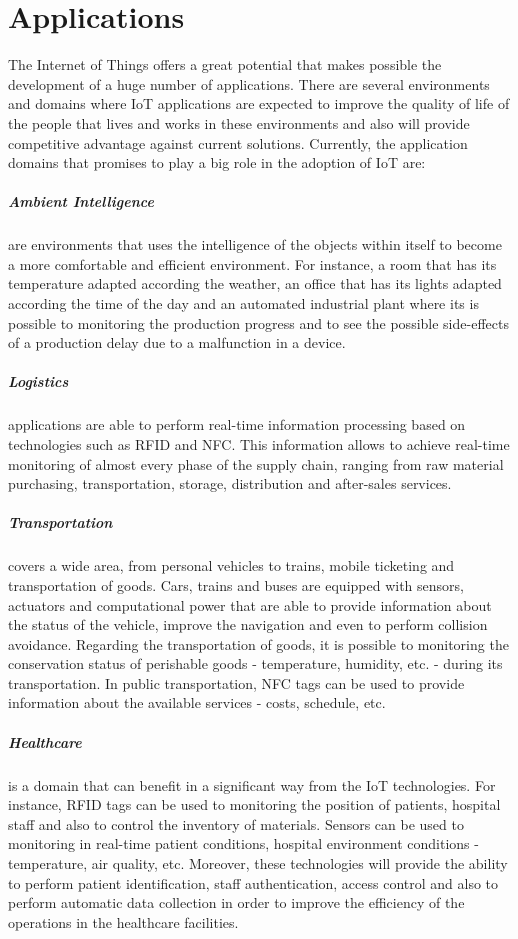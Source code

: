 \section{Applications}
\label{sec:applications}
The Internet of Things offers a great potential that makes possible the development of a huge number
of applications. There are several environments and domains where \gls{IoT} applications are expected
to improve the quality of life of the people that lives and works in these environments and also
will provide competitive advantage against current solutions. Currently, the application domains that
promises to play a big role in the adoption of \gls{IoT} are:

\subparagraph{Ambient Intelligence} are environments that uses the intelligence of the objects within
itself to become a more comfortable and efficient environment. For instance, a room that has its
temperature adapted according the weather, an office that has its lights adapted according the time
of the day and an automated industrial plant where its is possible to monitoring the production
progress and to see the  possible side-effects of a production delay due to a malfunction in a device.
\subparagraph{Logistics} applications are able to perform real-time information processing based
on technologies such as \gls{RFID} and \gls{NFC}. This information allows to achieve real-time monitoring
of almost every phase of the supply chain, ranging from raw material purchasing, transportation,
storage, distribution and after-sales services.
\subparagraph{Transportation} covers a wide area, from personal vehicles to trains, mobile ticketing
and transportation of goods. Cars, trains and buses are equipped with sensors, actuators and computational
power that are able to provide information about the status of the vehicle, improve the navigation and
even to perform collision avoidance. Regarding the transportation of goods, it is possible to monitoring
the conservation status of perishable goods - temperature, humidity, etc. -  during its transportation.
In public transportation, NFC tags can be used to provide information about the available services
- costs, schedule, etc.
\subparagraph{Healthcare} is a domain that can benefit in a significant way from the \gls{IoT}
technologies. For instance, \gls{RFID} tags can be used to monitoring the position of patients,
hospital staff and also to control the inventory of materials. Sensors can be used to monitoring
in real-time patient conditions, hospital environment conditions - temperature, air quality, etc.
Moreover, these technologies will provide the ability to perform patient identification, staff authentication,
access control and also to perform automatic data collection in order to improve the efficiency of
the operations in the healthcare facilities.\\

